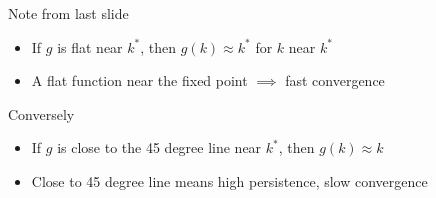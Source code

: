 \begin{frame}
    
    \begin{figure}
       \centering
    \end{figure}

\end{frame}


\begin{frame}
    
    Note from last slide

    \begin{itemize}
        \item If $g$ is flat near $k^*$, then $g(k) \approx k^*$ for $k$ near $k^*$
    \vspace{0.3em}
        \item A flat function near the fixed point $\implies$ fast convergence
    \end{itemize}

    \vspace{0.3em}
    \vspace{0.3em}
    Conversely

    \begin{itemize}
        \item If $g$ is close to the 45 degree line near $k^*$, then $g(k)
            \approx k$ 
    \vspace{0.3em}
        \item Close to 45 degree line means high persistence, slow convergence
    \end{itemize}


\end{frame}




